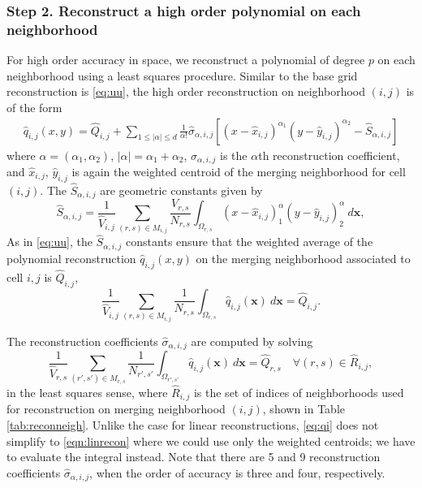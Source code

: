 \subsubsection*{Step 2. Reconstruct a high order polynomial on each neighborhood}
For high order accuracy in space, we reconstruct a polynomial of degree $p$ on each neighborhood using a least squares procedure.  Similar to the base grid reconstruction is \eqref{eq:uu}, the high order reconstruction on neighborhood $(i,j)$ is of the form
\begin{equation}\label{eq:q}
\begin{aligned}
    \widehat q_{i,j} (x,y) = \widehat{Q}_{i,j} +  \sum_{1 \leq
    |\alpha| \leq d}  \frac{1}{\alpha!} \widehat \sigma_{\alpha,i,j}
    [(x-\widehat x_{i,j})^{\alpha_1}(y-\widehat
    y_{i,j})^{\alpha_2}-\widehat S_{\alpha,i,j}]
\end{aligned}
\end{equation}
where $\alpha = (\alpha_1, \alpha_2)$, $|\alpha| = \alpha_1 + \alpha_2$, $\sigma_{\alpha,i,j}$ is the $\alpha$th reconstruction coefficient,
and $\widehat x_{i,j}$, $\widehat y_{i,j}$ is again the weighted centroid of the merging neighborhood for cell $(i,j)$. 
The $ \widehat S_{\alpha, i,j}$ are  geometric constants given by
$$
\widehat S_{\alpha, i,j} = \frac{1}{ \widehat{V}_{i,j}} \sum_{(r,s) \in M_{i,j} }\frac{V_{r,s}}{N_{r,s}} \int_{\Omega_{r,s}} 
(x-\widehat{x}_{i,j})^\alpha_1 (y-\widehat{y}_{i,j})^\alpha_2 
~d\mathbf{x},
$$
As in \eqref{eq:uu}, the $\widehat S_{\alpha, i,j}$ constants 
ensure that the weighted average of the polynomial 
reconstruction $\widehat q_{i,j}(x,y)$ on the merging neighborhood 
associated to cell $i,j$ is $\widehat{Q}_{i,j}$,
\begin{equation} \label{eq:average}
\frac{1}{ \widehat{V}_{i,j}} \sum_{(r,s) \in M_{i,j} }\frac{1}{N_{r,s}} \int_{\Omega_{r,s}} \widehat{q}_{i,j}(\mathbf{x}) ~d\mathbf{x} = \widehat{Q}_{i,j}.
\end{equation}


The reconstruction coefficients $\widehat \sigma_{\alpha,i,j}$ are computed by solving
\begin{equation}\label{eq:qi}
\frac{1}{\widehat{V}_{r,s}}\sum_{(r',s') \in M_{r,s}}\frac{1}{N_{r',s'}}\int_{\Omega_{r',s'}} \widehat q_{i,j}(\mathbf{x})~d\mathbf{x} = \widehat Q_{r,s} \quad \forall (r,s) \in \widehat R_{i,j},
\end{equation}
in the least squares sense, where $\widehat R_{i,j}$ is the set of
indices of neighborhoods used for reconstruction on merging
neighborhood $(i,j)$, shown in  Table \ref{tab:reconneigh}.  
Unlike the case for linear reconstructions, \eqref{eq:qi} does not
simplify to \eqref{eqn:linrecon} where we could use only the  
weighted centroids; we have to evaluate the integral instead.
Note that there are 5 and 9 reconstruction coefficients $\widehat{\sigma}_{\alpha, i,j}$, when the order of accuracy is three and four, respectively.

